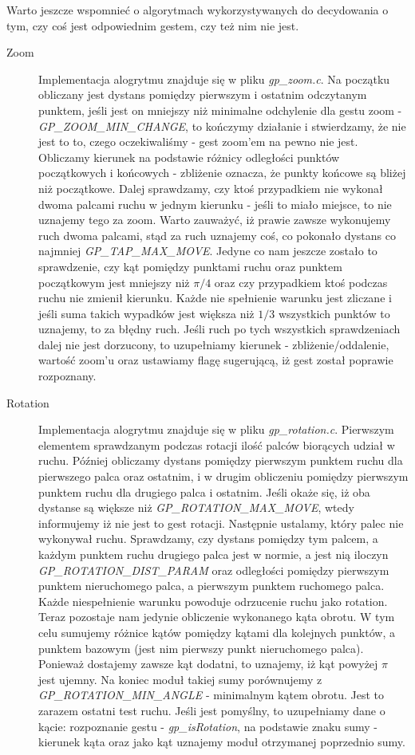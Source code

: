 \documentclass[a4paper,12pt]{article}
\begin{document}
Warto jeszcze wspomnieć o algorytmach wykorzystywanych do decydowania o tym, czy coś jest odpowiednim gestem, czy też nim nie jest.

\begin{description}
	\item[Zoom] Implementacja alogrytmu znajduje się w pliku \textit{gp_zoom.c}. Na początku obliczany jest dystans pomiędzy pierwszym i ostatnim odczytanym punktem, jeśli jest on mniejszy niż minimalne odchylenie dla gestu zoom - \textit{GP_ZOOM_MIN_CHANGE}, to kończymy działanie i stwierdzamy, że nie jest to to, czego oczekiwaliśmy - gest zoom'em na pewno nie jest. Obliczamy kierunek na podstawie różnicy odległości punktów początkowych i końcowych - zbliżenie oznacza, że punkty końcowe są bliżej niż początkowe. Dalej sprawdzamy, czy ktoś przypadkiem nie wykonał dwoma palcami ruchu w jednym kierunku - jeśli to miało miejsce, to nie uznajemy tego za zoom. Warto zauważyć, iż prawie zawsze wykonujemy ruch dwoma palcami, stąd za ruch uznajemy coś, co pokonało dystans co najmniej \textit{GP_TAP_MAX_MOVE}. Jedyne co nam jeszcze zostało to sprawdzenie, czy kąt pomiędzy punktami ruchu oraz punktem początkowym jest mniejszy niż $\pi/4$ oraz czy przypadkiem ktoś podczas ruchu nie zmienił kierunku. Każde nie spełnienie warunku jest zliczane i jeśli suma takich wypadków jest większa niż $1/3$ wszystkich punktów to uznajemy, to za błędny ruch. Jeśli ruch po tych wszystkich sprawdzeniach dalej nie jest dorzucony, to uzupełniamy kierunek - zbliżenie/oddalenie, wartość zoom'u oraz ustawiamy flagę sugerującą, iż gest został poprawie rozpoznany.
	
	\item[Rotation] Implementacja alogrytmu znajduje się w pliku \textit{gp_rotation.c}. Pierwszym elementem sprawdzanym podczas rotacji ilość palców biorących udział w ruchu. Później obliczamy dystans pomiędzy pierwszym punktem ruchu dla pierwszego palca oraz ostatnim, i w drugim obliczeniu pomiędzy pierwszym punktem ruchu dla drugiego palca i ostatnim. Jeśli okaże się, iż oba dystanse są większe niż \textit{GP_ROTATION_MAX_MOVE}, wtedy informujemy iż nie jest to gest rotacji. Następnie ustalamy, który palec nie wykonywał ruchu. Sprawdzamy, czy dystans pomiędzy tym palcem, a każdym punktem ruchu drugiego palca jest w normie, a jest nią iloczyn \textit{GP_ROTATION_DIST_PARAM} oraz odległości pomiędzy pierwszym punktem nieruchomego palca, a pierwszym punktem ruchomego palca. Każde niespełnienie warunku powoduje odrzucenie ruchu jako rotation. Teraz pozostaje nam jedynie obliczenie wykonanego kąta obrotu. W tym celu sumujemy różnice kątów pomiędzy kątami dla kolejnych punktów, a punktem bazowym (jest nim pierwszy punkt nieruchomego palca). Ponieważ dostajemy zawsze kąt dodatni, to uznajemy, iż kąt powyżej $ \pi $ jest ujemny. Na koniec moduł takiej sumy porównujemy z \textit{GP_ROTATION_MIN_ANGLE} - minimalnym kątem obrotu. Jest to zarazem ostatni test ruchu. Jeśli jest pomyślny, to uzupełniamy dane o kącie: rozpoznanie gestu - \textit{gp_isRotation}, na podstawie znaku sumy - kierunek kąta oraz jako kąt uznajemy moduł otrzymanej poprzednio sumy.
\end{description}
\end{document}
